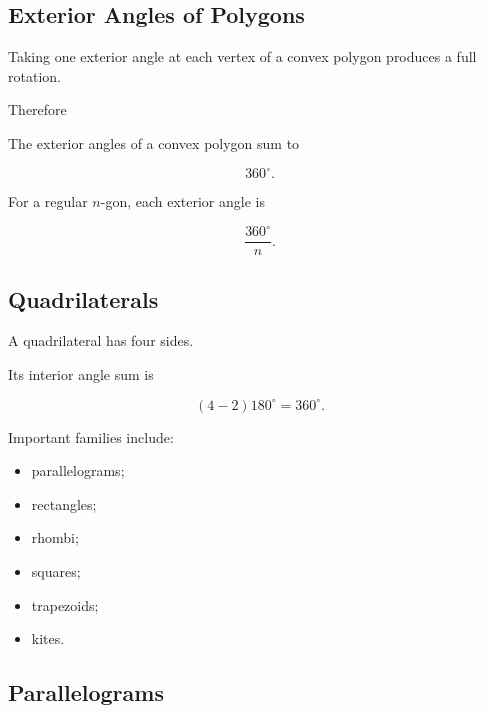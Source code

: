 \subsection{Exterior Angles of Polygons}
\label{subsec:polygon-exterior-angles}

Taking one exterior angle at each vertex of a convex polygon produces a full
rotation.

Therefore

\begin{theorem}
The exterior angles of a convex polygon sum to

\[ \boxed{360^\circ.} \]
\end{theorem}

For a regular \(n\)-gon, each exterior angle is

\[ \boxed{\frac{360^\circ}{n}.} \]

\subsection{Quadrilaterals}
\label{subsec:euclidean-quadrilaterals}

A quadrilateral has four sides.

Its interior angle sum is

\[ (4-2)180^\circ=360^\circ. \]

Important families include:

\begin{itemize}
    \item parallelograms;
    \item rectangles;
    \item rhombi;
    \item squares;
    \item trapezoids;
    \item kites.
\end{itemize}

\subsection{Parallelograms}
\label{subsec:parallelograms}


